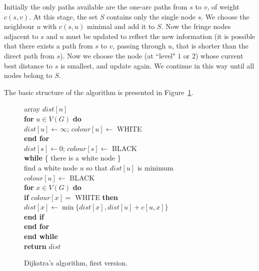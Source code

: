 Initially the only paths available are the one-arc paths from $s$ to
$v$, of weight $c(s, v)$. At this stage, the set $S$  contains only the
single node $s$. We choose the neighbour $u$ with $c(s, u)$ minimal and
add it to $S$. Now the fringe nodes adjacent to $s$ and $u$ must be
updated to reflect the new information (it is possible that there
exists a path from $s$ to $v$, passing through $u$, that is shorter
than the direct path from $s$). Now we choose the node (at ``level" $1$
or $2$) whose current best distance to $s$ is smallest, and update
again. We continue in this way until all nodes belong to $S$.

The basic structure of the algorithm is presented in
Figure~\ref{fig:dijkstra-alg}.

\begin{figure}


{
array $dist[n]$ \\

\textbf{for} $u\in V(G)$ \textbf{do} \\

\> $dist[u] \gets \infty$; $colour[u] \gets$ WHITE  \\

\textbf{end for} \\

$dist[s] \gets 0$; $colour[s] \gets $ BLACK\\

\textbf{while} \{ there is a white node \} \\

\> find a white node $u$ so that $dist[u]$ is minimum\\

\> $colour[u] \gets $ BLACK \\

\> \textbf{for}  $x\in V(G)$ \textbf{do}\\

\> \> \textbf{if} $colour[x] = $ WHITE  \textbf{then} \\

\> \> \> $dist[x] \gets \min \{dist[x], dist[u] + c[u,x]\}$\\  

\> \> \textbf{end if} \\

\> \textbf{end for} \\

\textbf{end while} \\

\textbf{return} $dist$ \\
}

\caption{Dijkstra's algorithm, first version.}
\label{fig:dijkstra-alg}
\end{figure}



